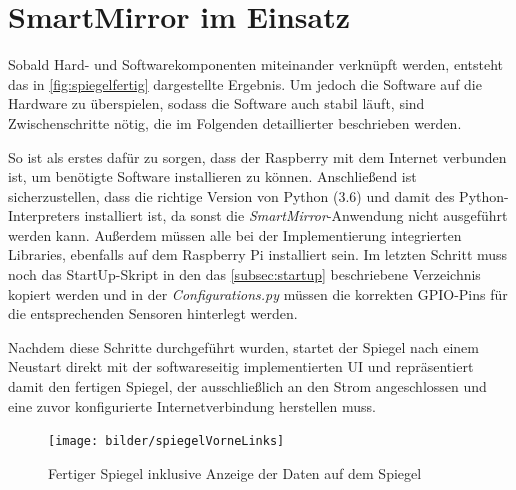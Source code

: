 \section{SmartMirror im Einsatz}
\label{sec:imEinsatz}

Sobald Hard- und Softwarekomponenten miteinander verknüpft werden, entsteht das in \autoref{fig:spiegelfertig} dargestellte Ergebnis.
Um jedoch die Software auf die Hardware zu überspielen, sodass die Software auch stabil läuft, sind Zwischenschritte nötig, die im Folgenden detaillierter beschrieben werden.

So ist als erstes dafür zu sorgen, dass der Raspberry mit dem Internet verbunden ist, um benötigte Software installieren zu können. Anschließend ist sicherzustellen, dass die richtige Version von Python (3.6) und damit des Python-Interpreters installiert ist, da sonst die \textit{SmartMirror}-Anwendung nicht ausgeführt werden kann. 
Außerdem müssen alle bei der Implementierung integrierten Libraries, ebenfalls auf dem Raspberry Pi installiert sein. 
Im letzten Schritt muss noch das StartUp-Skript in den das \autoref{subsec:startup} beschriebene Verzeichnis kopiert werden und in der \textit{Configurations.py} müssen die korrekten GPIO-Pins für die entsprechenden Sensoren hinterlegt werden. 

Nachdem diese Schritte durchgeführt wurden, startet der Spiegel nach einem Neustart direkt mit der softwareseitig implementierten UI und repräsentiert damit den fertigen Spiegel, der ausschließlich an den Strom angeschlossen und eine zuvor konfigurierte Internetverbindung herstellen muss. 

\begin{figure}
	\centering
	\texttt{[image: bilder/spiegelVorneLinks]}
	\caption[Fertiger Spiegel inklusive Anzeige der Daten]{Fertiger Spiegel inklusive Anzeige der Daten auf dem Spiegel}
	\label{fig:spiegelfertig}
\end{figure}
